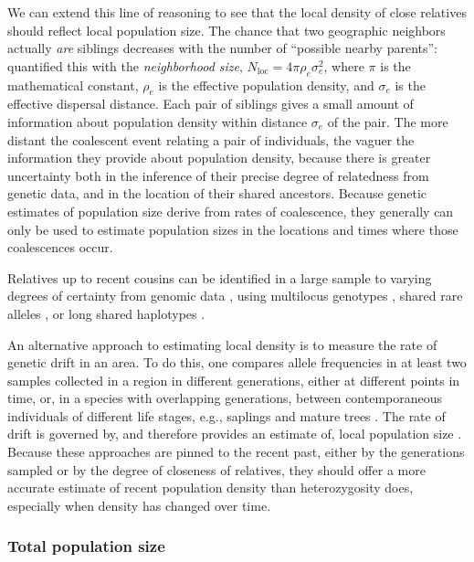 \documentclass{ar-1col}
\newcommand{\g}[1]{{\color{blue}{#1}}}
\renewcommand{\emph}[1]{{\textit{#1}}}
\begin{document}
We can extend this line of reasoning to see that 
the local density of close relatives
should reflect local population size.
The chance that two geographic neighbors actually \emph{are} siblings 
decreases with the number of ``possible nearby parents'':
\citet{wright1946isolation} quantified this with the
\emph{neighborhood size}, 
$N_\text{loc} = 4 \pi \rho_e \sigma_e^2$,
where $\pi$ is the mathematical constant,
$\rho_e$ is the effective population density,
and $\sigma_e$ is the effective dispersal distance.
Each pair of siblings gives a small amount of information
about population density within distance $\sigma_e$ of the pair.
The more distant the coalescent event relating a pair of individuals, 
the vaguer the information they provide about population density,
because there is greater uncertainty 
both in the inference of their precise degree of relatedness from genetic data,
and in the location of their shared ancestors.
Because genetic estimates of population size 
derive from rates of coalescence,
they generally can only be used to estimate population sizes 
in the locations and times where those coalescences occur.

Relatives up to recent cousins can be identified in a large sample to varying degrees of certainty 
from genomic data \citep[reviewed in][]{wang2016prediction},
using multilocus genotypes \citep{nomura2008estimation,WaplesWaples2011,Wang_2014},
shared rare alleles \citep{NovembreSlatkin2009}, 
or long shared haplotypes \citep[e.g.,][]{li2014relationship}.

An alternative approach to estimating local density
is to measure the rate of genetic drift in an area.
To do this, one compares allele frequencies
in at least two samples collected in a region in different generations, 
either at different points in time,
or, in a species with overlapping generations, 
between contemporaneous individuals of different life stages, 
e.g., saplings and mature trees
\citep{WilliamsonSlatkin1999}.
The rate of drift is governed by, 
and therefore provides an estimate of, 
local population size
\citep[analogous to \g{\emph{variance effective size}} of a population][]{ewens2004mpg,Charlesworth2009}.
Because these approaches are pinned to the recent past, 
either by the generations sampled or by the degree of closeness of relatives,
they should offer a more accurate estimate of recent population density than heterozygosity does, 
especially when density has changed over time.

\subsubsection{Total population size}
\end{document}

